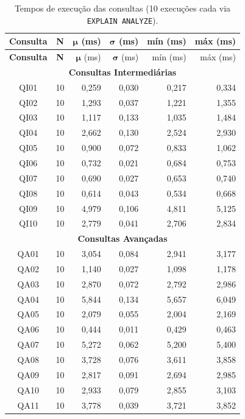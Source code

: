 \documentclass[12pt,a4paper]{article}
\begin{document}
\begin{longtable}{|c|c|r|r|r|r|}
\caption{Tempos de execução das consultas (10 execuções cada via \texttt{EXPLAIN ANALYZE}).}
\label{tab:tempos-execucao}\\
\hline
\textbf{Consulta} & \textbf{N} & $\boldsymbol{\mu}$ \textbf{(ms)} & $\boldsymbol{\sigma}$ \textbf{(ms)} & \textbf{mín (ms)} & \textbf{máx (ms)} \\
\hline
\endfirsthead
\hline
\textbf{Consulta} & \textbf{N} & $\boldsymbol{\mu}$ (ms) & $\boldsymbol{\sigma}$ (ms) & mín (ms) & máx (ms) \\
\hline
\endhead
\multicolumn{6}{|c|}{\textbf{Consultas Intermediárias}} \\
\hline
QI01 & 10 & 0,259 & 0,030 & 0,217 & 0,334 \\
QI02 & 10 & 1,293 & 0,037 & 1,221 & 1,355 \\
QI03 & 10 & 1,117 & 0,133 & 1,035 & 1,484 \\
QI04 & 10 & 2,662 & 0,130 & 2,524 & 2,930 \\
QI05 & 10 & 0,900 & 0,072 & 0,833 & 1,062 \\
QI06 & 10 & 0,732 & 0,021 & 0,684 & 0,753 \\
QI07 & 10 & 0,690 & 0,027 & 0,653 & 0,740 \\
QI08 & 10 & 0,614 & 0,043 & 0,534 & 0,668 \\
QI09 & 10 & 4,979 & 0,106 & 4,811 & 5,125 \\
QI10 & 10 & 2,779 & 0,041 & 2,706 & 2,834 \\
\hline
\multicolumn{6}{|c|}{\textbf{Consultas Avançadas}} \\
\hline
QA01 & 10 & 3,054 & 0,084 & 2,941 & 3,177 \\
QA02 & 10 & 1,140 & 0,027 & 1,098 & 1,178 \\
QA03 & 10 & 2,870 & 0,072 & 2,792 & 2,986 \\
QA04 & 10 & 5,844 & 0,134 & 5,657 & 6,049 \\
QA05 & 10 & 2,079 & 0,055 & 2,004 & 2,169 \\
QA06 & 10 & 0,444 & 0,011 & 0,429 & 0,463 \\
QA07 & 10 & 5,272 & 0,062 & 5,200 & 5,400 \\
QA08 & 10 & 3,728 & 0,076 & 3,611 & 3,858 \\
QA09 & 10 & 2,817 & 0,091 & 2,694 & 2,985 \\
QA10 & 10 & 2,933 & 0,079 & 2,855 & 3,103 \\
QA11 & 10 & 3,778 & 0,039 & 3,721 & 3,852 \\

\end{longtable}
\end{document}
